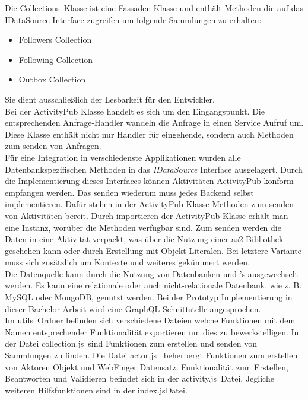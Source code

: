 Die \glqq Collections\grqq~Klasse ist eine Fassaden Klasse und enthält Methoden die auf das IDataSource Interface zugreifen um folgende Sammlungen zu erhalten:
\begin{itemize}
	\item Followers Collection
	\item Following Collection
	\item Outbox Collection
\end{itemize} 
Sie dient ausschließlich der Lesbarkeit für den Entwickler.\\

Bei der ActivityPub Klasse handelt es sich um den Eingangspunkt. Die entsprechenden Anfrage-Handler wandeln die Anfrage in einen Service Aufruf um. Diese Klasse enthält nicht nur Handler für eingehende, sondern auch Methoden zum senden von Anfragen.\\

Für eine Integration in verschiedenste Applikationen wurden alle Datenbankspezifischen Methoden in das \textit{IDataSource} Interface ausgelagert. Durch die Implementierung dieses Interfaces können Aktivitäten ActivityPub konform empfangen werden. Das senden wiederum muss jedes Backend selbst implementieren. Dafür stehen in der ActivityPub Klasse Methoden zum senden von Aktivitäten bereit. Durch importieren der ActivityPub Klasse erhält man eine Instanz, worüber die Methoden verfügbar sind. Zum senden werden die Daten in eine Aktivität verpackt, was über die Nutzung einer \gls{as2} Bibliothek geschehen kann oder durch Erstellung mit Objekt Literalen. Bei letztere Variante muss sich zusätzlich um Kontexte und weiteres gekümmert werden.\\

Die Datenquelle kann durch die Nutzung von Datenbanken und 's ausgewechselt werden. Es kann eine relationale oder auch nicht-relationale Datenbank, wie z. B. MySQL oder MongoDB, genutzt werden. Bei der Prototyp Implementierung in dieser Bachelor Arbeit wird eine GraphQL Schnittstelle angesprochen.\\

Im \glqq utils\grqq~Ordner befinden sich verschiedene Dateien welche Funktionen mit dem Namen entsprechender Funktionalität exportieren um dies zu bewerkstelligen. In der Datei \glqq collection.js\grqq~sind Funktionen zum erstellen und senden von Sammlungen zu finden. Die Datei \glqq actor.js\grqq~ beherbergt Funktionen zum erstellen von Aktoren Objekt und WebFinger Datensatz. Funktionalität zum Erstellen, Beantworten und Validieren befindet sich in der \glqq activity.js\grqq~Datei. Jegliche weiteren Hilfsfunktionen sind in der \glqq index.js\grqq Datei.\\

